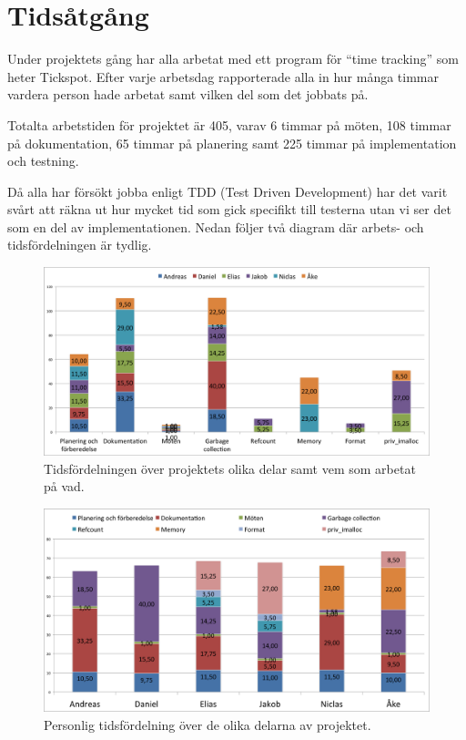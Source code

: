 \documentclass{article}
\begin{document}
\section{Tidsåtgång}

Under projektets gång har alla arbetat med ett program för “time tracking” som heter Tickspot. Efter varje arbetsdag rapporterade alla in hur många timmar vardera person hade arbetat samt vilken del som det jobbats på.

Totalta arbetstiden för projektet är 405, varav 6 timmar på möten, 108 timmar på dokumentation, 65 timmar på planering samt 225 timmar på implementation och testning.

Då alla har försökt jobba enligt TDD (Test Driven Development) har det varit svårt att räkna ut hur mycket tid som gick specifikt till testerna utan vi ser det som en del av implementationen. Nedan följer två diagram där arbets- och tidsfördelningen är tydlig.

\begin{figure}[H]
  \includegraphics[width=\columnwidth]{images/chart_parts.png}
  \caption{Tidsfördelningen över projektets olika delar 
    samt vem som arbetat på vad.}
  \label{fig:chart_parts}
\end{figure}

\begin{figure}[H]
  \includegraphics[width=\columnwidth]{images/chart_people.png}
  \caption{Personlig tidsfördelning över de olika delarna av projektet.}
  \label{fig:chart_people}
\end{figure}
\end{document}
